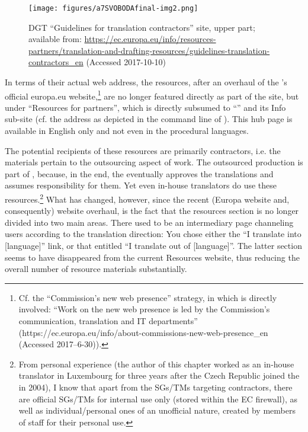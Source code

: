 \documentclass[output=paper]{langsci/langscibook}
\begin{document}
  
\begin{figure}
\caption{DGT “Guidelines for translation contractors” site, upper part; available from: \url{https://ec.europa.eu/info/resources-partners/translation-and-drafting-resources/guidelines-translation-contractors_en} (Accessed 2017-10-10)}
\label{fig:svoboda:2}
\texttt{[image: figures/a7SVOBODAfinal-img2.png]}
\end{figure}

 


In terms of their actual web address, the resources, after an overhaul of the ’s official europa.eu website,\footnote{Cf. the “Commission's new web presence” strategy, in which  is directly involved: “Work on the new web presence is led by the Commission’s communication, translation and IT departments” (https://ec.europa.eu/info/about-commissions-new-web-presence\_en (Accessed 2017–6-30)).} are no longer featured directly as part of the  site, but under “Resources for partners”, which is directly subsumed to “” and its Info sub-site (cf. the address as depicted in the command line of ). This hub page is available in English only and not even in the procedural languages.

\largerpage
The potential recipients of these resources are primarily  contractors, i.e. the materials pertain to the outsourcing aspect of  work. The outsourced production is part of , because, in the end, the \citeauthor{DGT2008} eventually approves the translations and assumes responsibility for them. Yet even in-house translators do use these resources.\footnote{From personal experience (the author of this chapter worked as an in-house  translator in Luxembourg for three years after the Czech Republic joined the  in 2004), I know that apart from the SGs/TMs targeting contractors, there are official SGs/TMs for internal use only (stored within the EC firewall), as well as individual/personal ones of an unofficial nature, created by members of staff for their personal use.} What has changed, however, since the recent (Europa website and, consequently)  website overhaul, is the fact that the resources section is no longer divided into two main areas. There used to be an intermediary page channeling users according to the translation direction: You chose either the “I translate into [language]” link, or that entitled “I translate out of [language]”. The latter section seems to have disappeared from the current Resources website, thus reducing the overall number of resource materials substantially.
\end{document}
